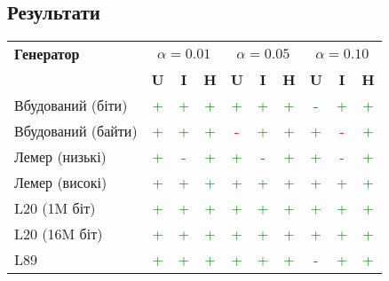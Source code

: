 \documentclass[12pt]{article}
\begin{document}
\subsection{Результати}
\begin{table}[htbp]
\centering
\small
\begin{tabular}{l*{9}{c}}
\toprule
\multirow{}{}{\textbf{Генератор}} & \multicolumn{3}{c}{\textbf{$\alpha = 0.01$}} & \multicolumn{3}{c}{\textbf{$\alpha = 0.05$}} & \multicolumn{3}{c}{\textbf{$\alpha = 0.10$}} \\
\cmidrule(lr){2-4} \cmidrule(lr){5-7} \cmidrule(lr){8-10}
 & \textbf{U} & \textbf{I} & \textbf{H} & \textbf{U} & \textbf{I} & \textbf{H} & \textbf{U} & \textbf{I} & \textbf{H} \\
\midrule
Вбудований (біти)  & \textcolor{green}{+} & \textcolor{green}{+} & \textcolor{green}{+} & \textcolor{green}{+} & \textcolor{green}{+} & \textcolor{green}{+} & \textcolor{red}{-} & \textcolor{green}{+} & \textcolor{green}{+} \\
Вбудований (байти) & \textcolor{green}{+} & \textcolor{green}{+} & \textcolor{green}{+} & \textcolor{red}{-} & \textcolor{green}{+} & \textcolor{green}{+} & \textcolor{green}{+} & \textcolor{red}{-} & \textcolor{green}{+} \\
Лемер (низькі)     & \textcolor{green}{+} & \textcolor{red}{-} & \textcolor{green}{+} & \textcolor{green}{+} & \textcolor{red}{-} & \textcolor{green}{+} & \textcolor{green}{+} & \textcolor{red}{-} & \textcolor{green}{+} \\
Лемер (високі)     & \textcolor{green}{+} & \textcolor{green}{+} & \textcolor{green}{+} & \textcolor{green}{+} & \textcolor{green}{+} & \textcolor{green}{+} & \textcolor{green}{+} & \textcolor{green}{+} & \textcolor{green}{+} \\
L20 (1M біт)       & \textcolor{green}{+} & \textcolor{green}{+} & \textcolor{green}{+} & \textcolor{green}{+} & \textcolor{green}{+} & \textcolor{green}{+} & \textcolor{green}{+} & \textcolor{green}{+} & \textcolor{green}{+} \\
L20 (16M біт)      & \textcolor{green}{+} & \textcolor{green}{+} & \textcolor{green}{+} & \textcolor{green}{+} & \textcolor{green}{+} & \textcolor{green}{+} & \textcolor{green}{+} & \textcolor{green}{+} & \textcolor{green}{+} \\
L89                & \textcolor{green}{+} & \textcolor{green}{+} & \textcolor{green}{+} & \textcolor{green}{+} & \textcolor{green}{+} & \textcolor{green}{+} & \textcolor{red}{-} & \textcolor{green}{+} & \textcolor{green}{+} \\

\end{tabular}
\end{table}
\end{document}
